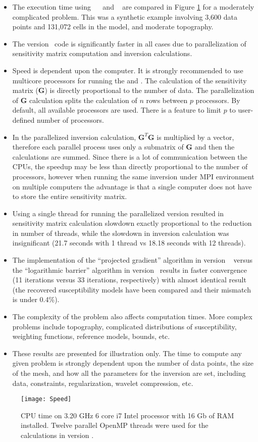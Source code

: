 \begin{itemize}
\item The execution time using \programName~\preV~ and \version~ are compared in Figure \ref{fig:Speed} for a moderately complicated problem. This was a synthetic example involving 3,600 data points and 131,072 cells in the model, and moderate topography.
\item The version \version~code is significantly faster in all cases due to parallelization of sensitivity matrix computation and inversion calculations.
\item Speed is dependent upon the computer. It is strongly recommended to use multicore processors for running the  and . The calculation of the sensitivity matrix (\textbf{G}) is directly proportional to the number of data. The parallelization of \textbf{G} calculation splits the calculation of $n$ rows between $p$ processors. By default, all available processors are used. There is a feature to limit $p$ to user-defined number of processors.
\item In the parallelized inversion calculation, $\mathbf{G}^T \mathbf{G}$ is multiplied by a vector, therefore each parallel process uses only a submatrix of $\mathbf{G}$ and then the calculations are summed. Since there is a lot of communication between the CPUs, the speedup may be less than directly proportional to the number of processors, however when running the same inversion under MPI environment on multiple computers the advantage is that a single computer does not have to store the entire sensitivity matrix.
\item Using a single thread for running the parallelized version resulted in sensitivity matrix calculation slowdown exactly proportional to the reduction in number of threads, while the slowdown in inversion calculation was insignificant (21.7 seconds with 1 thread vs 18.18 seconds with 12 threads).
\item The implementation of the ``projected gradient'' algorithm in version \version~ versus the ``logarithmic barrier'' algorithm in version ~\preV results in faster convergence (11 iterations versus 33 iterations, respectively) with almost identical result (the recovered susceptibility models have been compared and their mismatch is under 0.4\%).
\item The complexity of the problem also affects computation times. More complex problems include topography, complicated distributions of susceptibility, weighting functions, reference models, bounds, etc.
\item These results are presented for illustration only. The time to compute any given problem is strongly dependent upon the number of data points, the size of the mesh, and how all the parameters for the inversion are set, including data, constraints, regularization, wavelet compression, etc.
\end{itemize}

\begin{figure}
\center
\texttt{[image: Speed]}
\caption{CPU time on 3.20 GHz 6 core i7 Intel processor with 16 Gb of RAM installed. Twelve parallel OpenMP threads were used for the calculations in version \version.}
\label{fig:Speed}
\end{figure}
